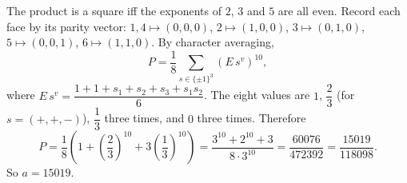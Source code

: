 The product is a square iff the exponents of $2$, $3$ and $5$ are all even. Record each face by its parity vector: $1,4\mapsto(0,0,0)$, $2\mapsto(1,0,0)$, $3\mapsto(0,1,0)$, $5\mapsto(0,0,1)$, $6\mapsto(1,1,0)$. By character averaging,
\[P=\dfrac18\sum_{s\in\{\pm1\}^3}\left(E\,s^{v}\right)^{10},\]
where $E\,s^{v}=\dfrac{1+1+s_1+s_2+s_3+s_1s_2}{6}$. The eight values are $1$, $\dfrac23$ (for $s=(+,+,-)$), $\dfrac13$ three times, and $0$ three times. Therefore
\[P=\dfrac18\left(1+\left(\dfrac23\right)^{10}+3\left(\dfrac13\right)^{10}\right)=\dfrac{3^{10}+2^{10}+3}{8\cdot3^{10}}=\dfrac{60076}{472392}=\dfrac{15019}{118098}.\]
So $a=\boxed{15019}$.
